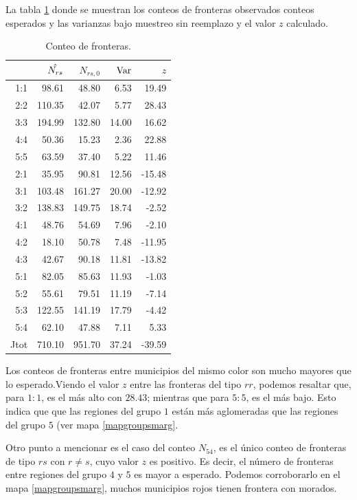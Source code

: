 La tabla \ref{tab:conteobordes} donde se muestran los conteos de fronteras observados conteos esperados y las varianzas bajo muestreo sin reemplazo y el valor $z$ calculado. 
\begin{table}[ht]
\centering
\begin{tabular}{rrrrr}
  \hline
 & $\Hat{N_{rs}}$  & $N_{rs,0}$ & ${\rm{Var}}$ & $z$ \\ 
  \hline
  1:1 & 98.61 & 48.80 & 6.53 & 19.49 \\ 
  2:2 & 110.35 & 42.07 & 5.77 & 28.43 \\ 
  3:3 & 194.99 & 132.80 & 14.00 & 16.62 \\ 
  4:4 & 50.36 & 15.23 & 2.36 & 22.88 \\ 
  5:5 & 63.59 & 37.40 & 5.22 & 11.46 \\ 
  2:1 & 35.95 & 90.81 & 12.56 & -15.48 \\ 
  3:1 & 103.48 & 161.27 & 20.00 & -12.92 \\ 
  3:2 & 138.83 & 149.75 & 18.74 & -2.52 \\ 
  4:1 & 48.76 & 54.69 & 7.96 & -2.10 \\ 
  4:2 & 18.10 & 50.78 & 7.48 & -11.95 \\ 
  4:3 & 42.67 & 90.18 & 11.81 & -13.82 \\ 
  5:1 & 82.05 & 85.63 & 11.93 & -1.03 \\ 
  5:2 & 55.61 & 79.51 & 11.19 & -7.14 \\ 
  5:3 & 122.55 & 141.19 & 17.79 & -4.42 \\ 
  5:4 & 62.10 & 47.88 & 7.11 & 5.33 \\ 
  Jtot & 710.10 & 951.70 & 37.24 & -39.59 \\ 
   \hline
\end{tabular}
\caption{Conteo de fronteras.}
\label{tab:conteobordes}
\end{table}

Los conteos de fronteras entre municipios del mismo color son mucho mayores que lo esperado.Viendo el valor $z$ entre las fronteras del tipo $rr$, podemos resaltar que, para $1:1$, es el más alto con $28.43$; mientras que para $5:5$, es el más bajo. Esto indica que 
que las regiones del grupo $1$ están más aglomeradas que las regiones del grupo $5$ (ver mapa \ref{mapgroupsmarg}. 

Otro punto a mencionar es el caso del conteo $N_{54}$, es el único conteo de fronteras de tipo $rs$ con $r\neq s$, cuyo valor $z$ es positivo. Es decir, el número de fronteras entre regiones del grupo $4$ y $5$ es mayor a esperado. Podemos corroborarlo en el mapa \ref{mapgroupsmarg}, muchos municipios rojos tienen frontera con morados.

